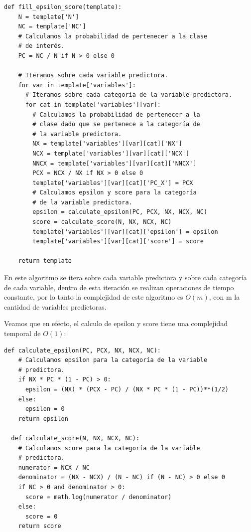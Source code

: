 \documentclass[
 12pt,
 letterpaper,
]{article}
\theoremstyle{teoremaBreak}
\theoremstyle{plain}
\theoremstyle{definition}
\begin{document}
\begin{lstlisting}[style=pseudocodigo]
  def fill_epsilon_score(template):
    N = template['N']
    NC = template['NC']
    # Calculamos la probabilidad de pertenecer a la clase
    # de interés.
    PC = NC / N if N > 0 else 0

    # Iteramos sobre cada variable predictora.
    for var in template['variables']:
      # Iteramos sobre cada categoría de la variable predictora.
      for cat in template['variables'][var]:
        # Calculamos la probabilidad de pertenecer a la 
        # clase dado que se pertenece a la categoría de 
        # la variable predictora.
        NX = template['variables'][var][cat]['NX']
        NCX = template['variables'][var][cat]['NCX']
        NNCX = template['variables'][var][cat]['NNCX']
        PCX = NCX / NX if NX > 0 else 0
        template['variables'][var][cat]['PC_X'] = PCX
        # Calculamos epsilon y score para la categoría 
        # de la variable predictora.
        epsilon = calculate_epsilon(PC, PCX, NX, NCX, NC)
        score = calculate_score(N, NX, NCX, NC)
        template['variables'][var][cat]['epsilon'] = epsilon
        template['variables'][var][cat]['score'] = score

    return template
\end{lstlisting}

En este algoritmo se itera sobre cada variable predictora y sobre cada categoría de cada variable, dentro de 
esta iteración se realizan operaciones de tiempo constante, por lo tanto la complejidad de este algoritmo 
es $O(m)$, con m la cantidad de variables predictoras.
  
Veamos que en efecto, el calculo de epsilon y score tiene una complejidad temporal de $O(1)$:

\begin{lstlisting}[style=pseudocodigo]
  def calculate_epsilon(PC, PCX, NX, NCX, NC):
    # Calculamos epsilon para la categoría de la variable
    # predictora.
    if NX * PC * (1 - PC) > 0:
      epsilon = (NX) * (PCX - PC) / (NX * PC * (1 - PC))**(1/2)
    else:
      epsilon = 0
    return epsilon

  def calculate_score(N, NX, NCX, NC):
    # Calculamos score para la categoría de la variable 
    # predictora.
    numerator = NCX / NC
    denominator = (NX - NCX) / (N - NC) if (N - NC) > 0 else 0
    if NC > 0 and denominator > 0:
      score = math.log(numerator / denominator)
    else:
      score = 0
    return score
\end{lstlisting}
\end{document}
